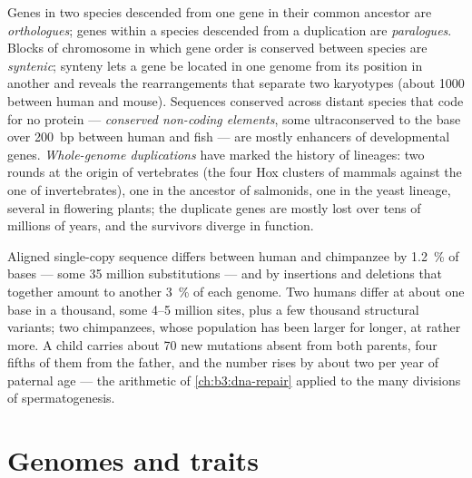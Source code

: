 \begin{definition}\label{def:b3:genomics:comparative}
Genes in two species descended from one gene in their common ancestor
are \emph{orthologues}; genes within a species descended from a
duplication are \emph{paralogues}. Blocks of chromosome in which gene
order is conserved between species are \emph{syntenic}; synteny lets a
gene be located in one genome from its position in another and reveals
the rearrangements that separate two karyotypes (about \num{1000}
between human and mouse). Sequences conserved across distant species
that code for no protein --- \emph{conserved non-coding elements},
some ultraconserved to the base over \qty{200}{bp} between human and
fish --- are mostly enhancers of developmental genes. \emph{Whole-genome
duplications} have marked the history of lineages: two rounds at the
origin of vertebrates (the four Hox clusters of mammals against the one
of invertebrates), one in the ancestor of salmonids, one in the yeast
lineage, several in flowering plants; the duplicate genes are mostly
lost over tens of millions of years, and the survivors diverge in
function.
\end{definition}

\begin{example}\label{ex:b3:genomics:chimp}
Aligned single-copy sequence differs between human and chimpanzee by
\qty{1.2}{\%} of bases --- some \num{35} million substitutions --- and
by insertions and deletions that together amount to another
\qty{3}{\%} of each genome. Two humans differ at about one base in a
thousand, some \numrange{4}{5} million sites, plus a few thousand
structural variants; two chimpanzees, whose population has been larger
for longer, at rather more. A child carries about \num{70} new
mutations absent from both parents, four fifths of them from the
father, and the number rises by about two per year of paternal age ---
the arithmetic of \cref{ch:b3:dna-repair} applied to the many divisions
of spermatogenesis.
\end{example}

\section{Genomes and traits}

